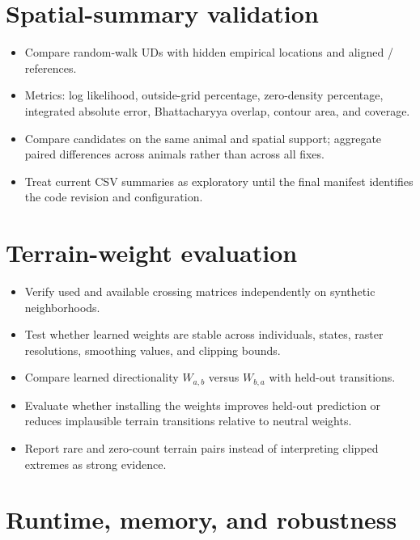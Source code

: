 \section{Spatial-summary validation}

\begin{itemize}
  \item Compare random-walk UDs with hidden empirical locations and aligned / references.
  \item Metrics: log likelihood, outside-grid percentage, zero-density percentage, integrated absolute error, Bhattacharyya overlap, contour area, and coverage.
  \item Compare candidates on the same animal and spatial support; aggregate paired differences across animals rather than across all fixes.
  \item Treat current CSV summaries as exploratory until the final manifest identifies the code revision and configuration.
\end{itemize}

\section{Terrain-weight evaluation}

\begin{itemize}
  \item Verify used and available crossing matrices independently on synthetic neighborhoods.
  \item Test whether learned weights are stable across individuals, states, raster resolutions, smoothing values, and clipping bounds.
  \item Compare learned directionality $W_{a,b}$ versus $W_{b,a}$ with held-out transitions.
  \item Evaluate whether installing the weights improves held-out prediction or reduces implausible terrain transitions relative to neutral weights.
  \item Report rare and zero-count terrain pairs instead of interpreting clipped extremes as strong evidence.
\end{itemize}

\section{Runtime, memory, and robustness}

